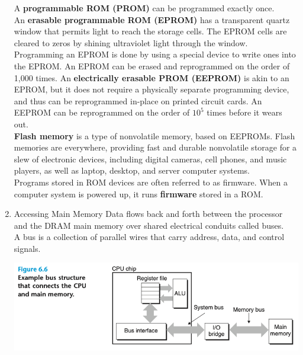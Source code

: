 \documentclass[11pt]{article}
\begin{document}
\begin{enumerate}
A \textbf{programmable ROM (PROM)} can be programmed exactly once.\\

An \textbf{erasable programmable ROM (EPROM)} has a transparent quartz window that permits light to reach the storage cells. The EPROM cells are cleared to zeros by shining ultraviolet light through the window. Programming an EPROM is done by using a special device to write ones into the EPROM. An EPROM can be erased and reprogrammed on the order of 1,000 times. An \textbf{electrically erasable PROM (EEPROM)} is akin to an EPROM, but it does not require a physically separate programming device, and thus can be reprogrammed in-place on printed circuit cards. An EEPROM can be reprogrammed on the order of \(10^5\) times before it wears out.\\

\textbf{Flash memory} is a type of nonvolatile memory, based on EEPROMs. Flash memories are everywhere, providing fast and durable nonvolatile storage for a slew of electronic devices, including digital cameras, cell phones, and music players, as well as laptop, desktop, and server computer systems.\\

Programs stored in ROM devices are often referred to as firmware. When a computer system is powered up, it runs \textbf{firmware} stored in a ROM.\\

\item Accessing Main Memory
\label{sec:orga7176f7}
Data flows back and forth between the processor and the DRAM main memory over shared electrical conduits called buses.\\

A bus is a collection of parallel wires that carry address, data, and control signals.\\

\begin{center}
\includegraphics[width=.9\linewidth]{pics/figure6.6-example-bus-structure-that-connects-the-cpu-and-memory.png}
\end{center}


\end{enumerate}
\end{document}
